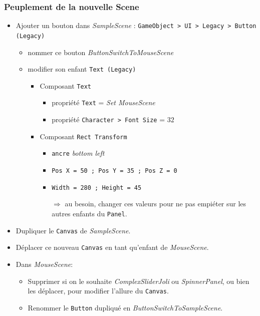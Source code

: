 \documentclass[a4paper,10pt]{article}
\newenvironment{solution}%
{\begin{tcolorbox}[breakable,colback=red!5!white,colframe=red!75!black,title=Solution]}%
{\end{tcolorbox}}
\begin{document}
\begin{solution}
\subsubsection{Peuplement de la nouvelle Scene}
\begin{itemize}
	\item  Ajouter un bouton dans \textit{SampleScene} : \texttt{GameObject > UI > Legacy > Button (Legacy)}
	\begin{itemize}
		\item nommer ce bouton \textit{ButtonSwitchToMouseScene}
		\item modifier son enfant \texttt{Text (Legacy)}
		\begin{itemize}
			\item Composant \texttt{Text}
			\begin{itemize}
				\item propriété \texttt{Text} = \textit{Set MouseScene}
				\item  propriété \texttt{Character > Font Size} = $32$
			\end{itemize}	
			\item Composant \texttt{Rect Transform}
			\begin{itemize}
				\item \texttt{ancre} \textit{bottom left}
				\item \texttt{Pos X = 50 ; Pos Y = 35 ; Pos Z = 0}
				\item 	\texttt{Width = 280 ; Height = 45}
				\item[$\Rightarrow$] au besoin, changer ces valeurs pour ne pas empiéter sur les autres enfants du \texttt{Panel}.
			\end{itemize}	
		\end{itemize}
	\end{itemize}

	\item Dupliquer le \texttt{Canvas} de \textit{SampleScene}.
	
	\item Déplacer ce nouveau  \texttt{Canvas} en tant qu'enfant de \textit{MouseScene}.
	
	\item Dans \textit{MouseScene}:
	\begin{itemize}
		\item Supprimer si on le souhaite \textit{ComplexSliderJoli} ou \textit{SpinnerPanel}, ou bien les déplacer, pour modifier l'allure du \texttt{Canvas}.
	
		\item Renommer le \texttt{Button} dupliqué en  \textit{ButtonSwitchToSampleScene}.
	

\end{itemize}
\end{itemize}
\end{solution}
\end{document}
